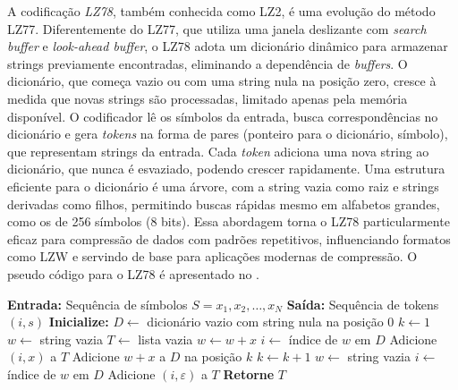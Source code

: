 A codificação \emph{LZ78}, também conhecida como LZ2, é uma evolução do método
LZ77. Diferentemente do LZ77, que utiliza uma janela deslizante com \emph{search buffer} e
\emph{look-ahead buffer}, o LZ78 adota um dicionário dinâmico para armazenar
strings previamente encontradas, eliminando a dependência de \emph{buffers}. O
dicionário, que começa vazio ou com uma string nula na posição zero, cresce à
medida que novas strings são processadas, limitado apenas pela memória
disponível. O codificador lê os símbolos da entrada, busca correspondências no
dicionário e gera \emph{tokens} na forma de pares (ponteiro para o
dicionário, símbolo), que representam strings da entrada. Cada \emph{token}
adiciona uma nova string ao dicionário, que nunca é esvaziado, podendo crescer
rapidamente. Uma estrutura eficiente para o dicionário é uma árvore, com a
string vazia como raiz e strings derivadas como filhos, permitindo buscas
rápidas mesmo em alfabetos grandes, como os de 256 símbolos (8 bits). Essa
abordagem torna o LZ78 particularmente eficaz para compressão de dados com
padrões repetitivos, influenciando formatos como LZW e servindo de base para
aplicações modernas de compressão. O pseudo código para o LZ78 é apresentado
no .

\begin{algorithm}
\caption{Codificação LZ78}
\label{alg:lz78}
\begin{algorithmic}[1]
\State \textbf{Entrada:} Sequência de símbolos \( S = x_1, x_2, \dots, x_N \)
\State \textbf{Saída:} Sequência de tokens \( (i, s) \)
\State \textbf{Inicialize:}
\State \quad \( D \gets \) dicionário vazio com string nula na posição 0
\State \quad \( k \gets 1 \) 
\State \quad \( w \gets \) string vazia 
\State \quad \( T \gets \) lista vazia 
        \State \( w \gets w + x \)
    \Else
        \State \( i \gets \) índice de \( w \) em \( D \)
        \State Adicione \( (i, x) \) a \( T \)
        \State Adicione \( w + x \) a \( D \) na posição \( k \)
        \State \( k \gets k + 1 \)
        \State \( w \gets \) string vazia
    \EndIf
\EndFor
{}
    \State \( i \gets \) índice de \( w \) em \( D \)
    \State Adicione \( (i, \varepsilon) \) a \( T \)
\EndIf
\State \textbf{Retorne} \( T \)
\end{algorithmic}
\end{algorithm}

